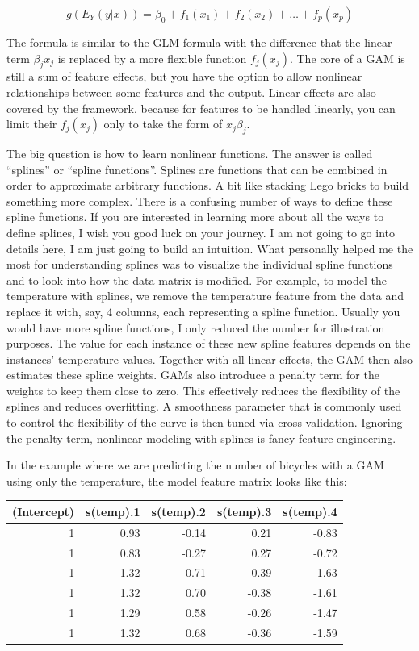 \documentclass[12pt,]{krantz}
\begin{document}
\[g(E_Y(y|x))=\beta_0+f_1(x_{1})+f_2(x_{2})+\ldots+f_p(x_{p})\]

The formula is similar to the GLM formula with the difference that the
linear term \(\beta_j{}x_{j}\) is replaced by a more flexible function
\(f_j(x_{j})\). The core of a GAM is still a sum of feature effects, but
you have the option to allow nonlinear relationships between some
features and the output. Linear effects are also covered by the
framework, because for features to be handled linearly, you can limit
their \(f_j(x_{j})\) only to take the form of \(x_{j}\beta_j\).

The big question is how to learn nonlinear functions. The answer is
called ``splines'' or ``spline functions''. Splines are functions that
can be combined in order to approximate arbitrary functions. A bit like
stacking Lego bricks to build something more complex. There is a
confusing number of ways to define these spline functions. If you are
interested in learning more about all the ways to define splines, I wish
you good luck on your journey. I am not going to go into details here, I
am just going to build an intuition. What personally helped me the most
for understanding splines was to visualize the individual spline
functions and to look into how the data matrix is modified. For example,
to model the temperature with splines, we remove the temperature feature
from the data and replace it with, say, 4 columns, each representing a
spline function. Usually you would have more spline functions, I only
reduced the number for illustration purposes. The value for each
instance of these new spline features depends on the instances'
temperature values. Together with all linear effects, the GAM then also
estimates these spline weights. GAMs also introduce a penalty term for
the weights to keep them close to zero. This effectively reduces the
flexibility of the splines and reduces overfitting. A smoothness
parameter that is commonly used to control the flexibility of the curve
is then tuned via cross-validation. Ignoring the penalty term, nonlinear
modeling with splines is fancy feature engineering.

In the example where we are predicting the number of bicycles with a GAM
using only the temperature, the model feature matrix looks like this:

\begin{tabular}{r|r|r|r|r}
\hline
(Intercept) & s(temp).1 & s(temp).2 & s(temp).3 & s(temp).4\\
\hline
1 & 0.93 & -0.14 & 0.21 & -0.83\\
\hline
1 & 0.83 & -0.27 & 0.27 & -0.72\\
\hline
1 & 1.32 & 0.71 & -0.39 & -1.63\\
\hline
1 & 1.32 & 0.70 & -0.38 & -1.61\\
\hline
1 & 1.29 & 0.58 & -0.26 & -1.47\\
\hline
1 & 1.32 & 0.68 & -0.36 & -1.59\\
\hline
\end{tabular}
\end{document}
